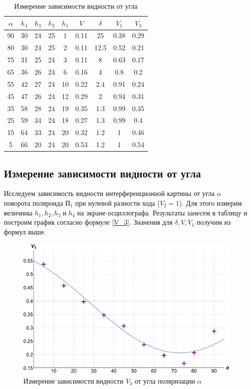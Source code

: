 \documentclass[12pt]{kiarticle}
\begin{document}
\begin{table}[h]
	\caption{Измерение зависимости видности от угла}
	\begin{center}
		\begin{tabular}{|c|c|c|c|c|c|c|c|c|}
			\hline
			$ 	\alpha  $ & $ h_4 $ &  $ h_3 $& $ h_2 $ & $ h_1 $ & $ V $ & $  \delta  $ & $ V_1 $ & $ V_3 $ \\
			\hline
			90 & 30 & 24 & 25 & 1 & 0.11 & 25 & 0.38 & 0.29 \\
			80 & 30 & 24 & 25 & 2 & 0.11 & 12.5 & 0.52 & 0.21 \\
			75 & 31 & 25 & 24 & 3 & 0.11 & 8 & 0.63 & 0.17 \\
			65 & 36 & 26 & 24 & 6 & 0.16 & 4 & 0.8 & 0.2 \\
			55 & 42 & 27 & 24 & 10 & 0.22 & 2.4 & 0.91 & 0.24 \\
			45 & 47 & 26 & 24 & 12 & 0.29 & 2 & 0.94 & 0.31 \\
			35 & 58 & 28 & 24 & 19 & 0.35 & 1.3 & 0.99 & 0.35 \\
			25 & 59 & 34 & 24 & 18 & 0.27 & 1.3 & 0.99 & 0.4 \\
			15 & 64 & 33 & 24 & 20 & 0.32 & 1.2 & 1 & 0.46 \\
			5 & 66 & 20 & 24 & 20 & 0.53 & 1.2 & 1 & 0.54 \\
			\hline
		\end{tabular}
	\end{center}
	\label{table_v3}
\end{table}

\subsection{Измерение зависимости видности от угла}

Исследуем зависимость видности интерференционной картины от угла
$ \alpha $ поворота поляроида $ П_1 $ при нулевой разности хода ($ V_2 = 1 $). Для этого измерим величины $ h_1, h_2, h_3 \; и \; h_4 $ на экране осциллографа. Результаты занесем в таблицу и построим график согласно формуле \eqref{V_3}. Значения для $ \delta, V, V_1 $ получим из формул выше.


		\begin{figure}[h]
	\label{graf_v3}
	\includegraphics[scale=0.47]{v3.pdf}
	\caption{Измерение зависимости видности $ V_3 $ от угла поляризации $ \alpha $}
\end{figure}
\end{document}
